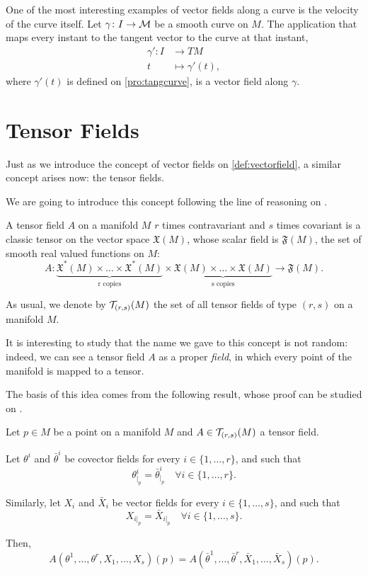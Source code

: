 \begin{example}
	One of the most interesting examples of vector fields along a curve is the velocity of the curve itself. Let $\gamma \colon I \to {\mathcal M}$ be a smooth curve on $M$. The application that maps every instant to the tangent vector to the curve at that instant,
	\begin{align*}
		\gamma' \colon I &\to TM \\
		t &\mapsto \gamma'(t),
	\end{align*}
	where $\gamma'(t)$ is defined on \autoref{pro:tangcurve}, is a vector field along $\gamma$.
\end{example}

\section{Tensor Fields}

Just as we introduce the concept of vector fields on \autoref{def:vectorfield}, a similar concept arises now: the tensor fields.

We are going to introduce this concept following the line of reasoning on \cite[Ch. 2]{oneill83}.

\begin{definition}
	A tensor field $A$ on a manifold $M$ $r$ times contravariant and $s$ times covariant is a classic tensor on the vector space $\mathfrak{X}(M)$, whose scalar field is $\mathfrak{F}(M)$, the set of smooth real valued functions on $M$:
	\[
		A \colon \underbrace{\mathfrak{X}^*(M) \times \dots \times \mathfrak{X}^*(M)}_{\text{r copies}} \times \underbrace{\mathfrak{X}(M) \times \dots \times \mathfrak{X}(M)}_{\text{s copies}} \to \mathfrak{F}(M).
	\]
	
	As usual, we denote by ${\mathcal T}_{(r,s)}(M)$ the set of all tensor fields of type $(r,s)$ on a manifold $M$.
\end{definition}

It is interesting to study that the name we gave to this concept is not random: indeed, we can see a tensor field $A$ as a proper \emph{field}, in which every point of the manifold is mapped to a tensor.

The basis of this idea comes from the following result, whose proof can be studied on \cite[Ch. 2, Proposition 2]{oneill83}.

\begin{proposition}
	Let $p \in M$ be a point on a manifold $M$ and $A \in {\mathcal T}_{(r,s)}(M)$ a tensor field.
	
	Let $\theta^i$ and $\bar{\theta}^i$ be covector fields for every $i \in \{1, \dots, r\}$, and such that
	\[
		\theta^i_{|_p} = \bar{\theta}^i_{|_p} \quad \forall i \in \{1, \dots, r\}.
	\]
	
	Similarly, let $X_i$ and $\bar{X}_i$ be vector fields for every $i \in \{1, \dots, s\}$, and such that
	\[
		X_{i|_p} = \bar{X}_{i|_p} \quad \forall i \in \{1, \dots, s\}.
	\]
	
	Then,
	\[
		A(\theta^1, \dots, \theta^r, X_1, \dots, X_s)(p) = A(\bar{\theta}^1, \dots, \bar{\theta}^r, \bar{X}_1, \dots, \bar{X}_s)(p).
	\]
\end{proposition}

